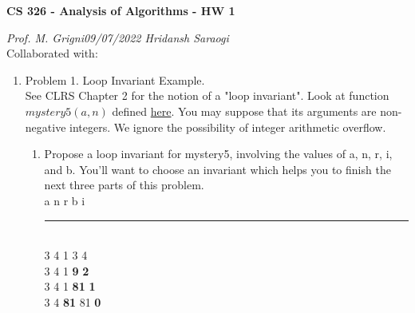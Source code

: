 \documentclass[11pt]{article}
\begin{document}
\begin{center}
    \textbf{CS 326 - Analysis of Algorithms - HW 1}\\
\end{center}


\begin{flushleft}
    \textit{Prof. M. Grigni\hfill09/07/2022 \hfill Hridansh Saraogi} \\
    \vspace{0.15cm}
    \small {Collaborated with: }
\end{flushleft}


\begin{enumerate}

\item Problem 1. Loop Invariant Example. \\
See CLRS Chapter 2 for the notion of a "loop invariant". Look at function $mystery5(a,n)$ defined \href{https://cs.emory.edu/~mic/demos/mystery5.html}{here}. You may suppose that its arguments are non-negative integers. We ignore the possibility of integer arithmetic overflow.
    \begin{enumerate}
        \item Propose a loop invariant for mystery5, involving the values of a, n, r, i, and b. You'll want to choose an invariant which helps you to finish the next three parts of this problem.\\
        
        a \hspace{0.5cm} n \hspace{0.5cm} r \hspace{0.5cm} b \hspace{0.5cm} i
        \\\rule{4 cm}{2}\\
        3 \hspace{0.5cm} 4 \hspace{0.5cm} 1 \hspace{0.5cm} 3 \hspace{0.5cm} 4\\
        3 \hspace{0.5cm} 4 \hspace{0.5cm} 1 \hspace{0.5cm} \textbf{9} \hspace{0.5cm} \textbf{2}\\
        3 \hspace{0.5cm} 4 \hspace{0.5cm} 1 \hspace{0.5cm} \textbf{81} \hspace{0.3cm} \textbf{1}\\  
        3 \hspace{0.5cm} 4 \hspace{0.5cm} \textbf{81} \hspace{0.3cm} 81 \hspace{0.3cm} \textbf{0}\\  
        

\end{enumerate}
\end{enumerate}
\end{document}
